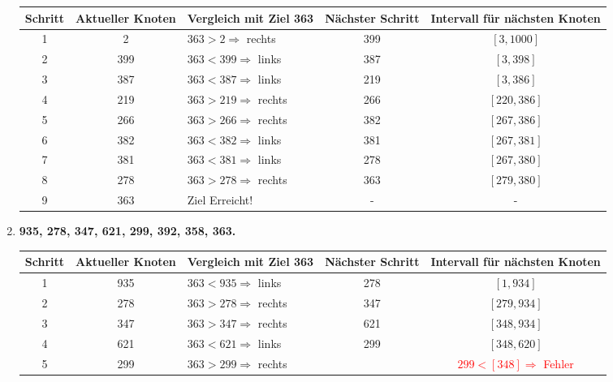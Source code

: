 \begin{enumerate}
\begin{center}
\small
\hspace*{-1.5cm}
\begin{tabular}{@{} c c l c c @{}}
\toprule
\textbf{Schritt} & \textbf{Aktueller Knoten} & \textbf{Vergleich mit Ziel 363} & \textbf{Nächster Schritt} & \textbf{Intervall für nächsten Knoten} \\
\midrule
1 & 2 & \( 363 > 2 \Rightarrow \) rechts & 399 & \([3, 1000]\) \\
2 & 399 & \( 363 < 399 \Rightarrow \) links & 387 & \([3, 398]\) \\
3 & 387 & \( 363 < 387 \Rightarrow \) links & 219 & \([3, 386]\) \\
4 & 219 & \( 363 > 219 \Rightarrow \) rechts & 266 & \([220, 386]\) \\
5 & 266 & \( 363 > 266 \Rightarrow \) rechts & 382 & \([267, 386]\) \\
6 & 382 & \( 363 < 382 \Rightarrow \) links & 381 & \([267, 381]\) \\
7 & 381 & \( 363 < 381 \Rightarrow \) links & 278 & \([267, 380]\) \\
8 & 278 & \( 363 > 278 \Rightarrow \) rechts & 363 & \([279, 380]\) \\
9 & 363 & Ziel Erreicht! & - & - \\
\bottomrule
\end{tabular}
\end{center}


\item \textbf{935, 278, 347, 621, 299, 392, 358, 363.}


\begin{center}
\small
\hspace*{-1.5cm}
\begin{tabular}{@{} c c l c c @{}}
\toprule
\textbf{Schritt} & \textbf{Aktueller Knoten} & \textbf{Vergleich mit Ziel 363} & \textbf{Nächster Schritt} & \textbf{Intervall für nächsten Knoten} \\
\midrule
1 & 935 & \( 363 < 935 \Rightarrow \) links & 278 & \([1, 934]\) \\
2 & 278 & \( 363 > 278 \Rightarrow \) rechts & 347 & \([279, 934]\) \\
3 & 347 & \( 363 > 347 \Rightarrow \) rechts & 621 & \([348, 934]\) \\
4 & 621 & \( 363 < 621 \Rightarrow \) links & 299 & \([348, 620]\) \\
5 & 299 & \( 363 > 299 \Rightarrow \) rechts & & \textcolor{red}{\( 299 < [348] \Rightarrow \) Fehler} \\
\bottomrule
\end{tabular}
\end{center}


\end{enumerate}
